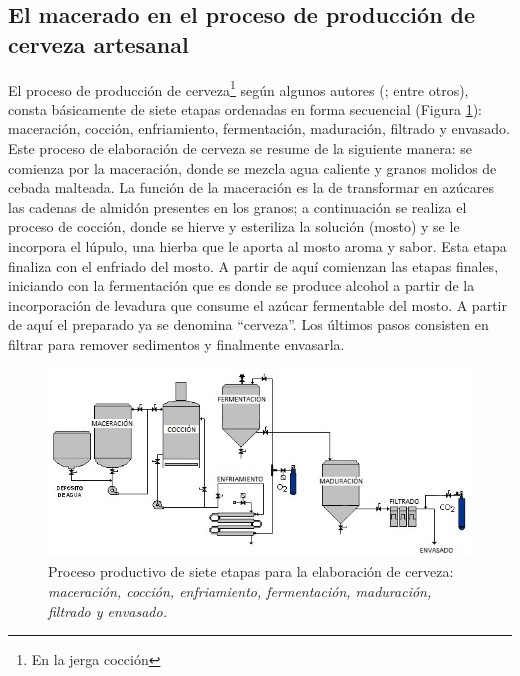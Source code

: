     \subsection{El macerado en el proceso de producción de cerveza artesanal}
    \par
    El proceso de producción de cerveza\footnote{En la jerga cocción} según algunos autores (\cite{Dummies08,DogBrewery,AmericanHomeBrewers18, Novozymes13}; entre otros), consta básicamente de siete etapas ordenadas en forma secuencial (Figura \ref{ProcFab}): maceración, cocción, enfriamiento, fermentación, maduración, filtrado y envasado. Este proceso de elaboración de cerveza se resume de la siguiente manera: se comienza por la maceración, donde se mezcla agua caliente y granos molidos de cebada malteada. La función de la maceración es la de transformar en azúcares las cadenas de almidón presentes en los granos; a continuación se realiza el proceso de cocción, donde se hierve y esteriliza la solución (mosto) y se le incorpora el lúpulo, una hierba que le aporta al mosto aroma y sabor. Esta etapa finaliza con el enfriado del mosto. A partir de aquí comienzan las etapas finales, iniciando con la fermentación que es donde se produce alcohol a partir de la incorporación de levadura que consume el azúcar fermentable del mosto. A partir de aquí el preparado ya se denomina ``cerveza''. Los últimos pasos consisten en filtrar para remover sedimentos y finalmente envasarla.
 
    \begin{figure}[h]
		\centerline{\includegraphics[scale=0.75]{introduccion/Etapasdelproceso.jpg}}
		\caption{Proceso productivo de siete etapas para la elaboración de cerveza: \textit{maceración, cocción, enfriamiento, fermentación, maduración, filtrado y envasado.}}
	    \label{ProcFab}
	\end{figure}
	
